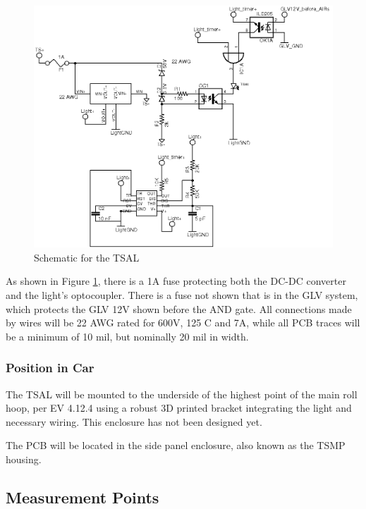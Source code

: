 \documentclass{article}
\begin{document}
            \begin{figure}[H]
            \centering
            \includegraphics[width = 0.7 \textwidth]{TSAL_FSAE}
            \caption{Schematic for the TSAL}
            \label{TSALschem}
            \end{figure}

            As shown in Figure \ref{TSALschem}, there is a 1A fuse protecting both the DC-DC converter and the light's optocoupler. There is a fuse not shown that is in the GLV system, which protects the GLV 12V shown before the AND gate. All connections made by wires will be 22 AWG rated for 600V, 125 \degree C and 7A, while all PCB traces will be a minimum of 10 mil, but nominally 20 mil in width.


        \subsubsection{Position in Car}

            The TSAL will be mounted to the underside of the highest point of the main roll hoop, per EV 4.12.4 using a robust 3D printed bracket integrating the light and necessary wiring. This enclosure has not been designed yet.

            The PCB will be located in the side panel enclosure, also known as the TSMP housing.

    \subsection{Measurement Points}
\end{document}
